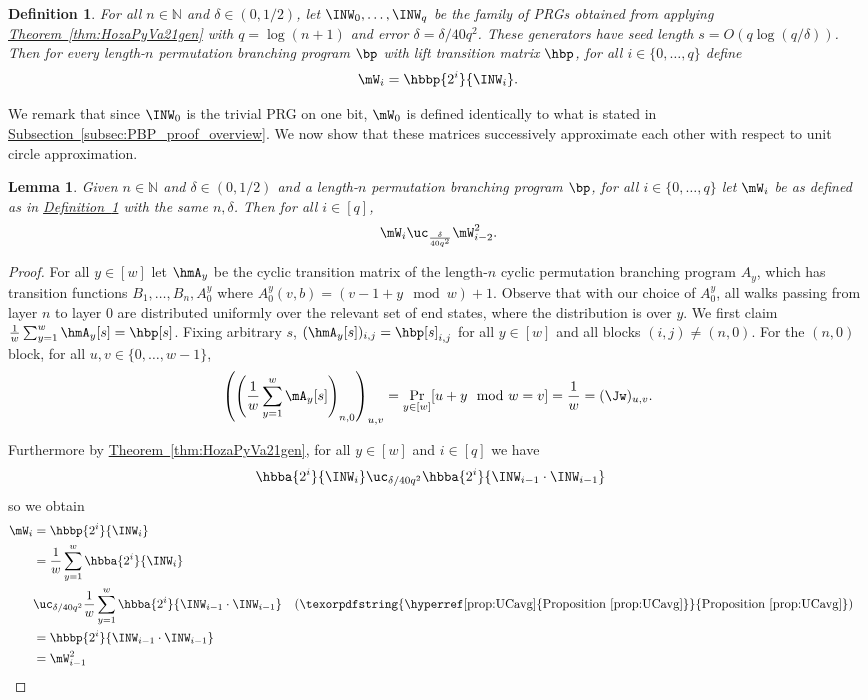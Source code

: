 \documentclass[11pt]{article}
\newcommand{\expref}[2]{\texorpdfstring{\hyperref[#2]{#1~\ref{#2}}}{#1~\ref{#2}}}
\newtheorem{lemma}[theorem]{Lemma}
\newtheorem{definition}[theorem]{Definition}
\newcommand{\N}{{\mathbb N}}
\begin{document}
\begin{definition}\label{def:basePRGfamily}
For all $n\in \N$ and $\delta\in (0,1/2)$, let $\INW_{0},\ldots,\INW_{q}$ be the family of PRGs obtained from applying \expref{Theorem}{thm:HozaPyVa21gen} with $q=\log(n+1)$ and error $\delta=\delta/40q^2$. These generators have seed length $s=O(q\log(q/\delta))$. Then for every length-$n$ permutation branching program $\bp$ with lift transition matrix $\hbp$, for all $i\in\{0,\dots,q\}$ define
$$\mW_i = \hbbp{2^i}{\INW_i}.$$ 
\end{definition}
We remark that since $\INW_0$ is the trivial PRG on one bit, $\mW_0$ is defined identically to what is stated in \expref{Subsection}{subsec:PBP_proof_overview}. We now show that these matrices successively approximate each other with respect to unit circle approximation.

\begin{lemma}\label{lem:WsUC}
Given $n\in\N$ and $\delta\in(0,1/2)$ and a length-$n$ permutation branching program $\bp$, for all $i\in\{0,\dots,q\}$ let $\mW_i$ be as defined as in \expref{Definition}{def:basePRGfamily} with the same $n,\delta$. Then for all $i\in [q]$,
$$\mW_{i} \uc_{\frac{\delta}{40q^2}} \mW_{i-2}^2.$$
\end{lemma}

\begin{proof}
For all $y\in [w]$ let $\hmA_y$ be the cyclic transition matrix of the length-$n$ cyclic permutation branching program $A_y$, which has transition functions $B_1,\ldots,B_n,A^y_0$ where $A^y_{0}(v,b)=(v-1+y \mod w)+1$. Observe that with %
%
our
%
choice of $A^y_0$, all walks passing from layer $n$ to layer $0$ are distributed uniformly over the relevant set of end states, where the distribution is over $y$. We first claim $\frac{1}{w}\sum_{y=1}^w\hmA_y[s]=\hbp[s]$. Fixing arbitrary $s$, $(\hmA_y[s])_{i,j}=\hbp[s]_{i,j}$ for all $y\in [w]$ and all blocks $(i,j)\neq (n,0)$. For the $(n,0)$ block, for all $u,v\in \{0,\dots,w-1\}$,
$$\left(\left(\frac{1}{w}\sum_{y=1}^w\mA_y[s]\right)_{n,0}\right)_{u,v} = \Pr_{y\in[w]}[u+y \mod w =v] = \frac{1}{w}=(\Jw)_{u,v}.$$

Furthermore by \expref{Theorem}{thm:HozaPyVa21gen}, for all $y \in [w]$ and $i\in [q]$ we have 
\begin{align*}
     \hbba{2^{i}}{\INW_{i}}
    &\uc_{\delta/40q^2}\hbba{2^{i}}{\INW_{i-1}\cdot\INW_{i-1}}%
\end{align*}
%
so 
we obtain %
\begin{align*}
    \mW_i &= \hbbp{2^i}{\INW_i}\\ 
    &= \frac{1}{w}\sum_{y=1}^w\hbba{2^{i}}{\INW_{i}}\\
    &\uc_{\delta/40q^2}\frac{1}{w}\sum_{y=1}^w \hbba{2^{i}}{\INW_{i-1}\cdot\INW_{i-1}} && \text{(\expref{Proposition}{prop:UCavg})}\\
    &= \hbbp{2^i}{\INW_{i-1}\cdot\INW_{i-1}}\\ 
    &= \mW_{i-1}^2
    &&\qedhere
\end{align*}

\end{proof}
\end{document}
